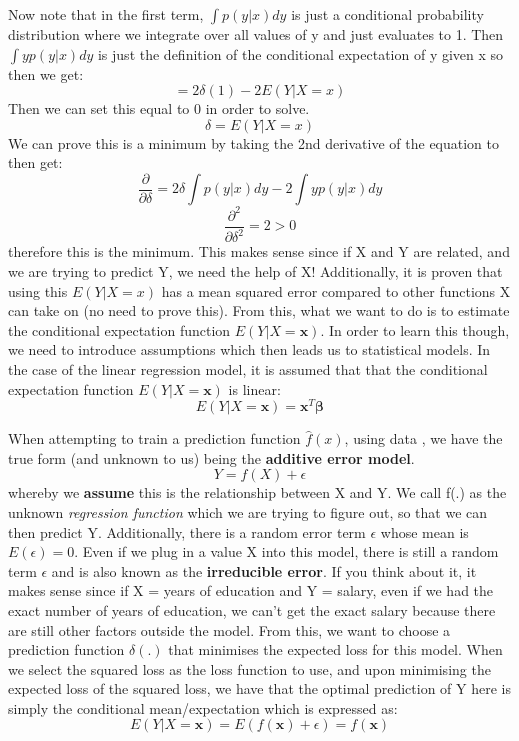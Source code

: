 \documentclass[11pt, oneside]{article}
\def\dataset{\text{$\{(y_i, {\bm{x_i}})\}_{i=1}^N$}}
\theoremstyle{definition}
\begin{document}
Now note that in the first term, $\int p(y|x)dy$ is just a conditional probability distribution where we integrate over all values of y and just evaluates to 1. Then $\int yp(y|x)dy$ is just the definition of the conditional expectation of y given x so then we get:
$$
= 2\delta(1) - 2E(Y|X=x)
$$
Then we can set this equal to 0 in order to solve.
$$
\delta = E(Y|X=x)
$$
We can prove this is a minimum by taking the 2nd derivative of the equation to then get:
$$
\frac{\partial}{\partial \delta}= 2\delta\int p(y|x)dy - 2\int yp(y|x)dy
$$
$$
\frac{\partial^2}{\partial \delta^2}= 2 > 0
$$
therefore this is the minimum. This makes sense since if X and Y are related, and we are trying to predict Y, we need the help of X! Additionally, it is proven that using this $E(Y|X=x)$ has a mean squared error compared to other functions X can take on (no need to prove this). From this, what we want to do is to estimate the conditional expectation function $E(Y|X=\bm{x})$. In order to learn this though, we need to introduce assumptions which then leads us to statistical models. In the case of the linear regression model, it is assumed that that the conditional expectation function $E(Y|X=\bm{x})$ is linear:
$$
E(Y|X=\bm{x}) = \bm{x}^T\bm{\beta}
$$

When attempting to train a prediction function $\hat{f}(x)$, using data \dataset, we have the true form (and unknown to us) being the \textbf{additive error model}.
$$
Y = f(X) + \epsilon
$$
whereby we \textbf{assume} this is the relationship between X and Y. We call f(.) as the unknown \textit{regression function} which we are trying to figure out, so that we can then predict Y. Additionally, there is a random error term $\epsilon$ whose mean is $E(\epsilon) = 0$. Even if we plug in a value X into this model, there is still a random term $\epsilon$ and is also known as the \textbf{irreducible error}. If you think about it, it makes sense since if X = years of education and Y = salary, even if we had the exact number of years of education, we can't get the exact salary because there are still other factors outside the model. From this, we want to choose a prediction function $\delta(.)$ that minimises the expected loss for this model. When we select the squared loss as the loss function to use, and upon minimising the expected loss of the squared loss, we have that the optimal prediction of Y here is simply the conditional mean/expectation which is expressed as:
$$
E(Y|X=\bm{x}) = E(f(\bm{x}) + \epsilon) = f(\bm{x})
$$
\end{document}
